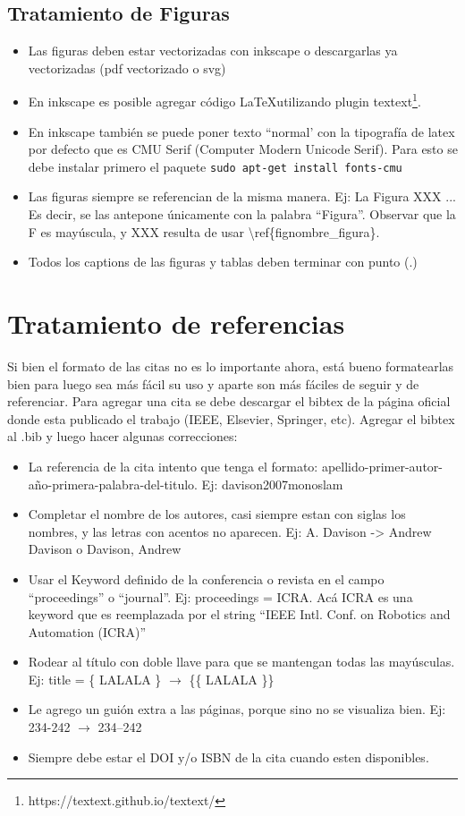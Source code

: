 \documentclass[a4paper,	11pt]{article}
\begin{document}
\subsection{Tratamiento de Figuras}
%
\begin{itemize}
    \item Las figuras deben estar vectorizadas con inkscape o descargarlas ya vectorizadas (pdf vectorizado o svg)
    \item En inkscape es posible agregar código \LaTeX utilizando plugin textext\footnote{https://textext.github.io/textext/}.
    \item En inkscape también se puede poner texto ``normal' con la tipografía de latex por defecto que es CMU Serif  (Computer Modern Unicode Serif). Para esto se debe instalar primero el paquete \lstinline{sudo apt-get install fonts-cmu}
    \item Las figuras siempre se referencian de la misma manera. Ej: La Figura XXX ... Es decir, se las antepone únicamente con la palabra ``Figura''. Observar que la F es mayúscula, y XXX resulta de usar \textbackslash ref\{fig\:nombre\_figura\}.
    \item Todos los captions de las figuras y tablas deben terminar con punto (.)
\end{itemize}


\section{Tratamiento de referencias}
Si bien el formato de las citas no es lo importante ahora, está bueno formatearlas bien para luego sea más fácil su uso y aparte son más fáciles de seguir y de referenciar. Para agregar una cita se debe descargar el bibtex de la página oficial donde esta publicado el trabajo (IEEE, Elsevier, Springer, etc). Agregar el bibtex al .bib y luego hacer algunas correcciones:
\begin{itemize}
    \item La referencia de la cita intento que tenga el formato: apellido-primer-autor-año-primera-palabra-del-titulo. Ej: davison2007monoslam
    \item Completar el nombre de los autores, casi siempre estan con siglas los nombres, y las letras con acentos no aparecen. Ej: A. Davison -> Andrew Davison o Davison, Andrew
    \item Usar el Keyword definido de la conferencia o revista en el campo ``proceedings'' o ``journal''. Ej: proceedings = ICRA. Acá ICRA es una keyword que es reemplazada por el string ``IEEE Intl. Conf. on Robotics and Automation (ICRA)''
    \item Rodear al título con doble llave para que se mantengan todas las mayúsculas. Ej: title = \{ LALALA \} $\rightarrow$ \{\{ LALALA \}\}
    \item Le agrego un guión extra a las páginas, porque sino no se visualiza bien. Ej: 234-242 $\rightarrow$ 234--242
    \item Siempre debe estar el DOI y/o ISBN de la cita cuando esten disponibles.
\end{itemize}
\end{document}
